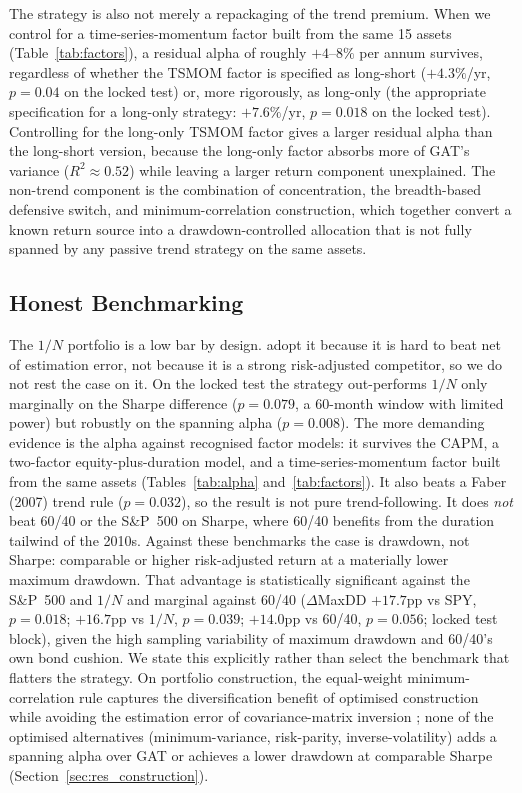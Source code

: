 The strategy is also not merely a repackaging of the trend premium. When we
control for a time-series-momentum factor built from the same 15 assets
(Table~\ref{tab:factors}), a residual alpha of roughly $+4$--$8\%$ per annum
survives, regardless of whether the TSMOM factor is specified as long-short
($+4.3\%$/yr, $p = 0.04$ on the locked test) or, more rigorously, as long-only
(the appropriate specification for a long-only strategy: $+7.6\%$/yr, $p = 0.018$
on the locked test). Controlling for the long-only TSMOM factor gives a
larger residual alpha than the long-short version, because the long-only
factor absorbs more of GAT's variance ($R^2 \approx 0.52$) while leaving a larger
return component unexplained. The non-trend component is the combination of
concentration, the breadth-based defensive switch, and minimum-correlation
construction, which together convert a known return source into a drawdown-controlled
allocation that is not fully spanned by any passive trend strategy on the same
assets.

\subsection{Honest Benchmarking}

The $1/N$ portfolio is a low bar by design. \citet{demiguel2009} adopt it
because it is hard to beat net of estimation error, not because it is a
strong risk-adjusted competitor, so we do not rest the case on it. On the locked
test the strategy out-performs $1/N$ only marginally on the Sharpe
difference ($p = 0.079$, a 60-month window with limited power) but robustly on the
spanning alpha ($p = 0.008$). The more demanding evidence is the alpha against
recognised factor models: it survives the CAPM, a two-factor equity-plus-duration
model, and a time-series-momentum factor built from the same assets
(Tables~\ref{tab:alpha} and~\ref{tab:factors}).
It also beats a Faber (2007) trend rule ($p = 0.032$), so the result is not pure
trend-following. It does \emph{not} beat 60/40 or the S\&P~500 on Sharpe, where
60/40 benefits from the duration tailwind of the 2010s. Against
these benchmarks the case is drawdown, not Sharpe: comparable or higher
risk-adjusted return at a materially lower maximum drawdown. That advantage is
statistically significant against the S\&P~500 and $1/N$ and marginal
against 60/40 ($\Delta$MaxDD $+17.7$pp vs SPY, $p=0.018$; $+16.7$pp vs $1/N$,
$p=0.039$; $+14.0$pp vs 60/40, $p=0.056$; locked test block), given the high sampling
variability of maximum drawdown and 60/40's own bond cushion.
We state this explicitly rather than select the benchmark that flatters the
strategy. On portfolio construction, the equal-weight minimum-correlation rule
captures the diversification benefit of optimised construction while avoiding the
estimation error of covariance-matrix inversion \citep{demiguel2009}; none of the
optimised alternatives (minimum-variance, risk-parity, inverse-volatility) adds a
spanning alpha over GAT or achieves a lower drawdown at comparable Sharpe
(Section~\ref{sec:res_construction}).

